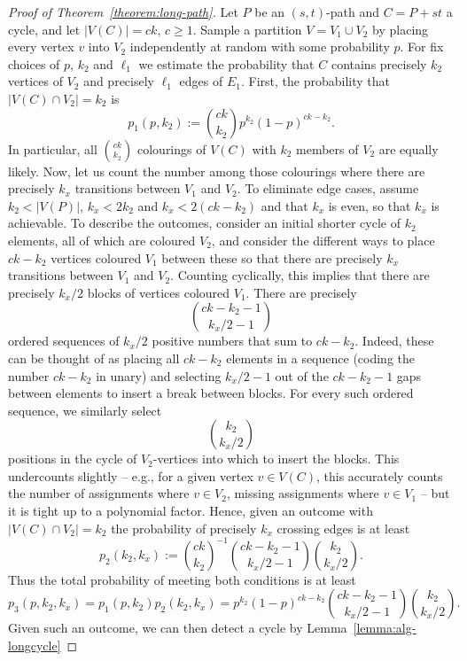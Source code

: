 \documentclass[10pt,a4paper]{article}
\begin{document}
\begin{proof}[Proof of Theorem~\ref{theorem:long-path}]
  Let $P$ be an $(s,t)$-path and $C=P+st$ a cycle, and let $|V(C)|=ck$, $c \geq 1$. 
  Sample a partition $V=V_1 \cup V_2$ by placing every vertex $v$ into $V_2$
  independently at random with some probability $p$.
  For fix choices of $p$, $k_2$ and $\ell_1$ we estimate the probability
  that $C$ contains precisely $k_2$ vertices of $V_2$ and
  precisely $\ell_1$ edges of $E_1$.
  First, the probability that $|V(C) \cap V_2|=k_2$ is
  \[
    p_1(p,k_2) := \binom{ck}{k_2} p^{k_2}(1-p)^{ck-k_2}.
  \]
  In particular, all $\binom{ck}{k_2}$ colourings of $V(C)$ 
  with $k_2$ members of $V_2$ are equally likely.
  Now, let us count the number among those colourings where
  there are precisely $k_x$ transitions between $V_1$ and $V_2$. 
  To eliminate edge cases, assume $k_2 < |V(P)|$, $k_x < 2k_2$
  and $k_x < 2(ck-k_2)$ and that $k_x$ is even, so that $k_x$ is achievable.
  To describe the outcomes, consider an initial shorter cycle
  of $k_2$ elements, all of which are coloured $V_2$, and consider
  the different ways to place $ck-k_2$ vertices coloured $V_1$ between
  these so that there are precisely $k_x$ transitions between $V_1$
  and $V_2$. Counting cyclically, this implies that there are
  precisely $k_x/2$ blocks of vertices coloured $V_1$.
  There are precisely
  \[
    \binom{ck-k_2-1}{k_x/2-1}
  \]
  ordered sequences of $k_x/2$ positive numbers that sum to $ck-k_2$.
  Indeed, these can be thought of as placing all $ck-k_2$ elements in
  a sequence (coding the number $ck-k_2$ in unary) and selecting $k_x/2-1$ 
  out of the $ck-k_2-1$ gaps between elements to insert a break between
  blocks. For every such ordered sequence, we similarly select
  \[
    \binom{k_2}{k_x/2}
  \]
  positions in the cycle of $V_2$-vertices into which to insert the blocks.
  This undercounts slightly -- e.g., for a given vertex $v \in V(C)$,
  this accurately counts the number of assignments where $v \in V_2$,
  missing assignments where $v \in V_1$ -- but it is tight up to a
  polynomial factor. Hence, given an outcome with $|V(C) \cap V_2|=k_2$ the probability
  of precisely $k_x$ crossing edges is at least
  \[
    p_2(k_2,k_x) := \binom{ck}{k_2}^{-1} \binom{ck-k_2-1}{k_x/2-1} \binom{k_2}{k_x/2}.
  \]
  Thus the total probability of meeting both conditions is at least
  \[
    p_3(p, k_2, k_x) = p_1(p,k_2) p_2(k_2,k_x)
    = p^{k_2}(1-p)^{ck-k_2} \binom{ck-k_2-1}{k_x/2-1} \binom{k_2}{k_x/2}.
  \]
  Given such an outcome, we can then detect a cycle by Lemma~\ref{lemma:alg-longcycle}

\end{proof}
\end{document}
